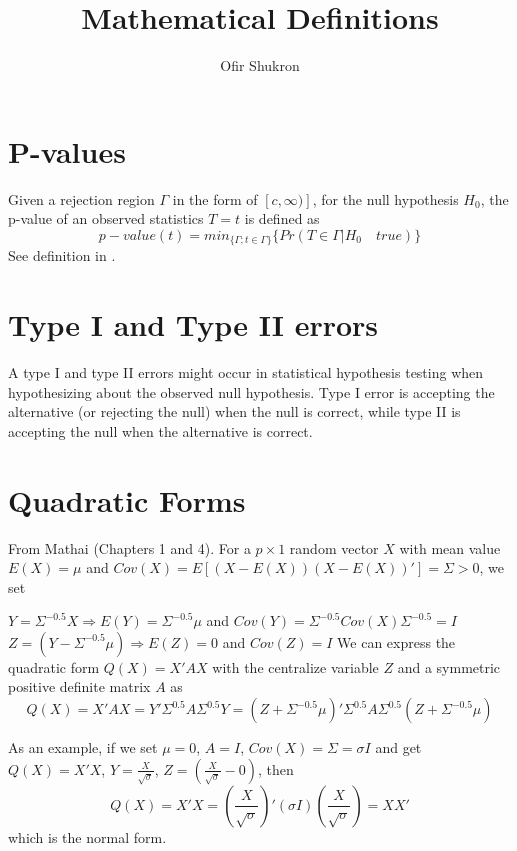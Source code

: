 \documentclass[12pt]{paper}
\begin{document}
\title{Mathematical Definitions}
\author{Ofir Shukron}
\maketitle
\section{P-values}
Given a rejection region $\Gamma$ in the form of $[c,\infty)]$, for the null hypothesis $H_0$,  the p-value of an observed statistics $T=t$ is defined as 
\begin{equation*}
p-value(t)=min_{\{\Gamma;t\in \Gamma\} } \{Pr(T\in\Gamma | H_0\quad true)\}
\end{equation*}
See definition in \cite{storey2002direct}.

\section{Type I and Type II errors}
A type I and type II errors might occur in statistical hypothesis testing when hypothesizing about the observed null hypothesis. Type I error is accepting the alternative (or rejecting the null) when the null is correct, while type II is accepting the null when the alternative is correct. 


\section{Quadratic Forms}\label{section_quadraticForms}
From Mathai \cite{mathai1992quadratic}(Chapters 1 and 4). For a $p\times 1$ random vector $X$ with mean value $E(X)=\mu$ and $Cov(X)=E[(X-E(X))(X-E(X))']=\Sigma>0$, we set 

$ Y=\Sigma^{-0.5}X\Rightarrow E(Y)=\Sigma^{-0.5}\mu$ and $Cov(Y)=\Sigma^{-0.5}Cov(X)\Sigma^{-0.5}=I$
$Z=(Y-\Sigma^{-0.5}\mu)\Rightarrow E(Z)=0$ and $Cov(Z)=I$ 
We can express the quadratic form $Q(X) =X'AX$ with the centralize variable $Z$ and a symmetric positive definite matrix $A$ as
\begin{equation}
Q(X)=X'AX=Y'\Sigma^{0.5}A\Sigma^{0.5}Y = (Z+\Sigma^{-0.5}\mu)'\Sigma^{0.5}A\Sigma^{0.5}(Z+\Sigma^{-0.5}\mu)	
\end{equation}

As an example, if we set $\mu = 0$, $A=I$, $Cov(X)=\Sigma=\sigma I$ and get 
$Q(X)=X'X$, $Y = \frac{X}{\sqrt{\sigma}}$, $Z=(\frac{X}{\sqrt{\sigma}}-0)$, then 
\begin{equation}
Q(X)=X'X= (\frac{X}{\sqrt{\sigma}})'(\sigma I)(\frac{X}{\sqrt{\sigma}})=XX'	
\end{equation}
which is the normal form.
\end{document}

